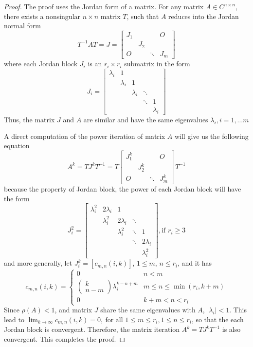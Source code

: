 \begin{proof}
The proof uses the Jordan form of a matrix. For any matrix $A\in C^{n\times n}$,
there exists a nonsingular $n\times n$ matrix $T$, such that $A$
reduces into the Jordan normal form 
\begin{equation}
T^{-1}AT=J=\left[\begin{array}{cccc}
J_{1} &  &  & O\\
 & J_{2}\\
O &  & \ddots & J_{m}
\end{array}\right]
\end{equation}
 where each Jordan block $J_{i}$ is an $r_{i}\times r_{i}$ submatrix
in the form 
\begin{equation}
J_{i}=\left[\begin{array}{ccccc}
\lambda_{i} & 1\\
 & \lambda_{i} & 1\\
 &  & \lambda_{i} & \ddots\\
 &  &  & \ddots & 1\\
 &  &  &  & \lambda_{i}
\end{array}\right]
\end{equation}
Thus, the matrix $J$ and $A$ are similar and have the same eigenvalues
$\lambda_{i},i=1,\ldots m$

A direct computation of the power iteration of matrix $A$ will give
us the following equation
\[
A^{k}=TJ^{k}T^{-1}=T\left[\begin{array}{cccc}
J_{1}^{k} &  &  & O\\
 & J_{2}^{k}\\
O &  & \ddots & J_{m}^{k}
\end{array}\right]T^{-1}
\]
because the property of Jordan block, the power of each Jordan block
will have the form
\[
J_{i}^{2}=\left[\begin{array}{ccccc}
\lambda_{i}^{2} & 2\lambda_{i} & 1\\
 & \lambda_{i}^{2} & 2\lambda_{i} & \ddots\\
 &  & \lambda_{i}^{2} & \ddots & 1\\
 &  &  & \ddots & 2\lambda_{i}\\
 &  &  &  & \lambda_{i}^{2}
\end{array}\right],\mbox{if }r_{i}\geq3
\]
 and more generally, let $J_{i}^{k}=\left[c_{m,n}\left(i,k\right)\right]$,
$1\leq m$, $n\leq r_{i}$, and it has 
\[
c_{m,n}\left(i,k\right)=\begin{cases}
0 & n<m\\
\left(\begin{array}{c}
k\\
n-m
\end{array}\right)\lambda_{i}^{k-n+m} & m\leq n\leq\min\left(r_{i},k+m\right)\\
0 & k+m<n<r_{i}
\end{cases}
\]
 Since $\rho\left(A\right)<1$, and matrix $J$ share the same eigenvalues
with $A$, $\left|\lambda_{i}\right|<1$. This lead to $\lim_{k\to\infty}c_{m,n}\left(i,k\right)=0,\:\mbox{for all }1\leq m\leq r_{i},1\leq n\leq r_{i}$,
so that the each Jordan block is convergent. Therefore, the matrix
iteration $A^{k}=TJ^{k}T^{-1}$ is also convergent. This completes
the proof. 
\end{proof}
